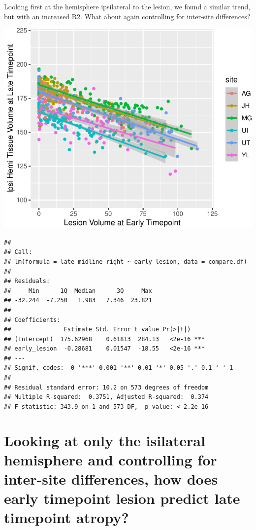 \documentclass[
]{article}
\begin{document}
Looking first at the hemisphere ipsilateral to the lesion, we found a
similar trend, but with an increased R2. What about again controlling
for inter-site differences?

\begin{center}\includegraphics{paper_files/figure-latex/plot_raw_ipsi-1} \end{center}

\begin{verbatim}
## 
## Call:
## lm(formula = late_midline_right ~ early_lesion, data = compare.df)
## 
## Residuals:
##     Min      1Q  Median      3Q     Max 
## -32.244  -7.250   1.983   7.346  23.821 
## 
## Coefficients:
##               Estimate Std. Error t value Pr(>|t|)    
## (Intercept)  175.62968    0.61813  284.13   <2e-16 ***
## early_lesion  -0.28681    0.01547  -18.55   <2e-16 ***
## ---
## Signif. codes:  0 '***' 0.001 '**' 0.01 '*' 0.05 '.' 0.1 ' ' 1
## 
## Residual standard error: 10.2 on 573 degrees of freedom
## Multiple R-squared:  0.3751, Adjusted R-squared:  0.374 
## F-statistic: 343.9 on 1 and 573 DF,  p-value: < 2.2e-16
\end{verbatim}

\hypertarget{looking-at-only-the-isilateral-hemisphere-and-controlling-for-inter-site-differences-how-does-early-timepoint-lesion-predict-late-timepoint-atropy}{%
\section{Looking at only the isilateral hemisphere and controlling for
inter-site differences, how does early timepoint lesion predict late
timepoint
atropy?}\label{looking-at-only-the-isilateral-hemisphere-and-controlling-for-inter-site-differences-how-does-early-timepoint-lesion-predict-late-timepoint-atropy}}
\end{document}
